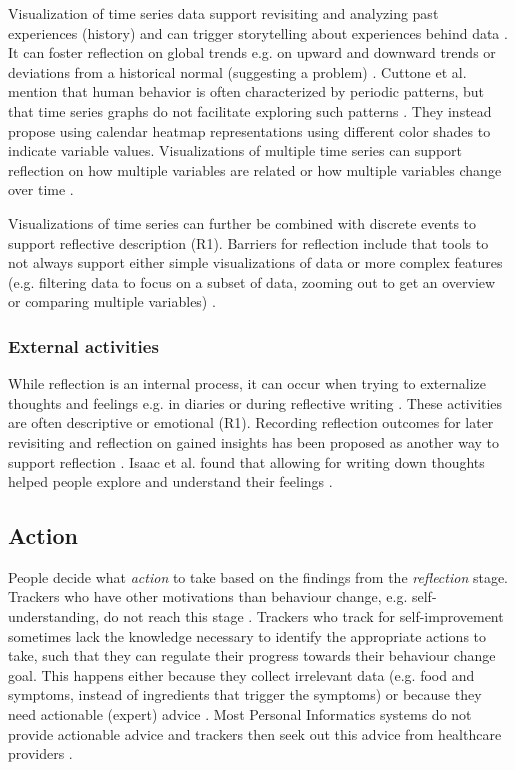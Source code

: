 Visualization of time series data support revisiting and analyzing past experiences (history) and can trigger storytelling about experiences behind data \cite{Rivera, Muller}. It can foster reflection on global trends e.g. on upward and downward trends or deviations from a historical normal (suggesting a problem) \cite{Rivera}. Cuttone et al. mention that human behavior is often characterized by periodic patterns, but that time series graphs do not facilitate exploring such patterns \cite{Cuttone}. They instead propose using calendar heatmap representations using different color shades to indicate variable values. Visualizations of multiple time series can support reflection on how multiple variables are related or how multiple variables change over time \cite{Cuttone}. 

Visualizations of time series can further be combined with discrete events \cite{Sorensen} to support reflective description (R1). Barriers for reflection include that tools to not always support either simple visualizations of data or more complex features (e.g. filtering data to focus on a subset of data, zooming out to get an overview or comparing multiple variables) \cite{Li2011, MacLeod}. 

\subsubsection{External activities}
While reflection is an internal process, it can occur when trying to externalize thoughts and feelings e.g. in diaries or during reflective writing \cite{Mols}. These activities are often descriptive or emotional (R1). Recording reflection outcomes for later revisiting and reflection on gained insights has been proposed as another way to support reflection \cite{Isaac, Muller}. Isaac et al. found that allowing for writing down thoughts helped people explore and understand their feelings \cite{Isaac}. 

\subsection{Action} 
People decide what \textit{action} to take based on the findings from the \textit{reflection} stage. Trackers who have other motivations than behaviour change, e.g. self-understanding, do not reach this stage \cite{Epstein2015}. Trackers who track for self-improvement sometimes lack the knowledge necessary to identify the appropriate actions to take, such that they can regulate their progress towards their behaviour change goal. This happens either because they collect irrelevant data \cite{Choe2014, Chung2015} (e.g. food and symptoms, instead of ingredients that trigger the symptoms) or because they need actionable (expert) advice \cite{Verdezoto2015, Li2010, Oh2015}. Most Personal Informatics systems do not provide actionable advice \cite{Chung2015, Li2010, Verdezoto2015} and trackers then seek out this advice from healthcare providers \cite{Li2010}.

